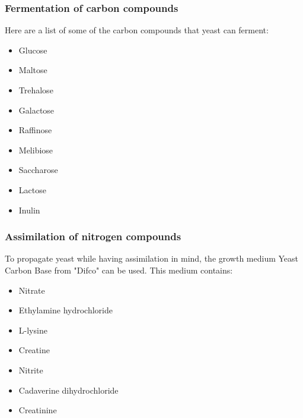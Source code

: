 \subsubsection*{Fermentation of carbon compounds}
Here are a list of some of the carbon compounds that yeast can ferment:

\begin{highlight}
    \begin{multicols}{3}
        \begin{itemize}
            \item Glucose
            \item Maltose
            \item Trehalose
            \item Galactose
            \item Raffinose
            \item Melibiose
            \item Saccharose
            \item Lactose
            \item Inulin
        \end{itemize}
    \end{multicols}
\end{highlight}

\subsubsection*{Assimilation of nitrogen compounds}
To propagate yeast while having assimilation in mind, the growth medium Yeast Carbon Base from "Difco" can be used. This medium contains:

\begin{highlight}
    \begin{multicols}{2}
        \begin{itemize}
            \item Nitrate
            \item Ethylamine hydrochloride
            \item L-lysine
            \item Creatine
            \item Nitrite
            \item Cadaverine dihydrochloride
            \item Creatinine
        \end{itemize}
    \end{multicols}
\end{highlight}

